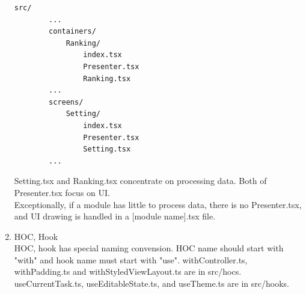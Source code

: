 \documentclass[conference]{IEEEtran}
\begin{document}
\begin{enumerate}
    \begin{lstlisting}[frame=single]
    src/
        ...
        containers/
            Ranking/
                index.tsx
                Presenter.tsx
                Ranking.tsx
        ...
        screens/
            Setting/
                index.tsx
                Presenter.tsx
                Setting.tsx
        ...
    \end{lstlisting}
    
    Setting.tsx and Ranking.tsx concentrate on processing data. Both of Presenter.tsx focus on UI. \\ 
    Exceptionally, if a module has little to process data, there is no Presenter.tsx, and UI drawing is handled in a [module name].tsx file. \\
    
\item HOC, Hook \\
    HOC, hook has special naming convension. HOC name should start with "with" and hook name must start with "use". withController.ts, withPadding.ts and withStyledViewLayout.ts are in src/hocs. useCurrentTask.ts, useEditableState.ts, and useTheme.ts are in src/hooks.
    
\end{enumerate}
\end{document}
